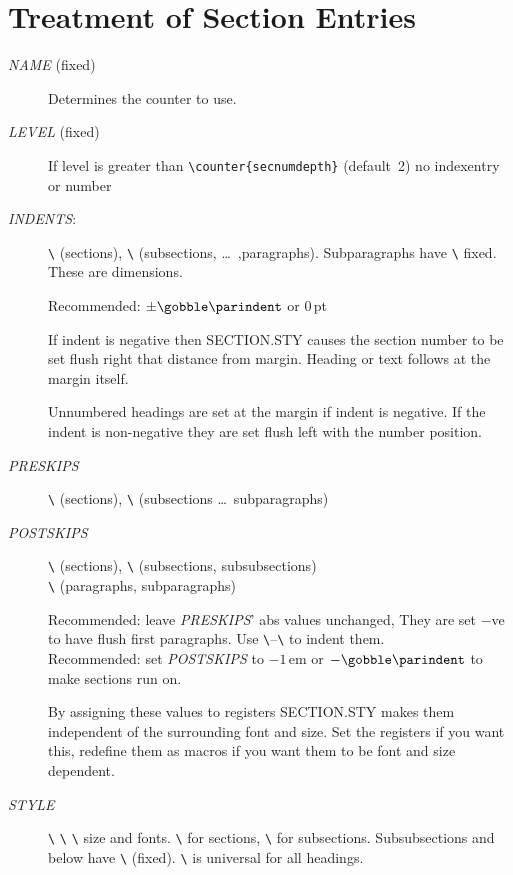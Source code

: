 \documentclass[pagesize=auto, numbers=enddot]{scrartcl}
\makeatletter
\newcommand*{\pkg}[1]{\textsf{#1}}
\newcommand*{\cs}[1]{\texttt{\textbackslash#1}}
\newcommand*{\cmd}[1]{\cs{\expandafter\@gobble\string#1}}
\newcommand*{\meta}[1]{\textlangle\textsl{#1}\textrangle}
\makeatother
\begin{document}
\section{Treatment of Section Entries}

\begin{description}
\item[\meta{NAME} (fixed)]
  Determines the counter to use.

\item[\meta{LEVEL} (fixed)]
  If level is greater than \verb|\counter{secnumdepth}| (default~2) no
  indexentry or number

\item[\meta{INDENTS}:]
  \cmd{\secindent} (sections), \cmd{\subindent} (subsections, \dots\ ,paragraphs).
  Subparagraphs have \cmd{\parindent} fixed. These are dimensions.

  Recommended: $\pm\cmd{\parindent}$ or 0\,pt

  If indent is negative then \pkg{SECTION.STY} causes the section number to be set
  flush right that distance from margin. Heading or text follows at the margin
  itself.

  Unnumbered headings are set at the margin if indent is negative. If the
  indent is non-negative they are set flush left with the number position.

\item[\meta{PRESKIPS}]
  \cmd{\secpreskp} (sections), \cmd{\subpreskp} (subsections \dots\ subparagraphs)

\item[\meta{POSTSKIPS}]
  \cmd{\secpstskp} (sections), \cmd{\subpstskp} (subsections, subsubsections) \\
  \cmd{\parpstskp} (paragraphs, subparagraphs)

  Recommended: leave \meta{PRESKIPS}' abs values unchanged, They are set $-$ve to
  have flush first paragraphs. Use \cmd{\secpreskp}--\cmd{\secpreskp} to indent them. \\
  Recommended: set \meta{POSTSKIPS} to $-1$\,em or $-\cmd{\parindent}$ to make sections run on.

  By assigning these values to registers \pkg{SECTION.STY} makes them independent of
  the surrounding font and size. Set the registers if you want this, redefine
  them as macros if you want them to be font and size dependent.

\item[\meta{STYLE}]
  \cmd{\secsize} \cmd{\subsize} \cmd{\hdfnt} size and fonts.
  \cmd{\secsize} for sections,
  \cmd{\subsize} for subsections.
  Subsubsections and below have \cmd{\normalsize} (fixed).
  \cmd{\hdfnt} is universal for all headings.
\end{description}
\end{document}
